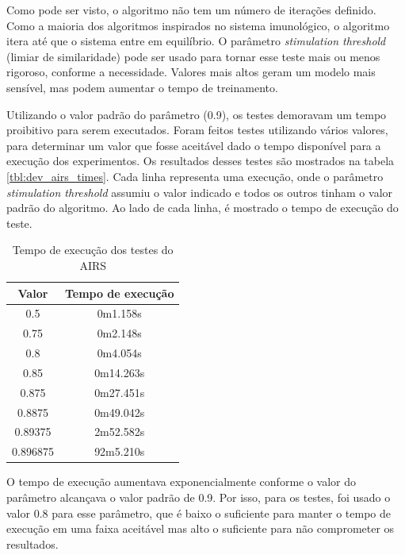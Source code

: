 Como pode ser visto, o algoritmo não tem um número de iterações definido. Como a maioria dos algoritmos inspirados no sistema imunológico, o algoritmo itera até que o sistema entre em equilíbrio. O parâmetro \emph{stimulation threshold} (limiar de similaridade) pode ser usado para tornar esse teste mais ou menos rigoroso, conforme a necessidade. Valores mais altos geram um modelo mais sensível, mas podem aumentar o tempo de treinamento.

Utilizando o valor padrão do parâmetro (0.9), os testes demoravam um tempo proibitivo para serem executados. Foram feitos testes utilizando vários valores, para determinar um valor que fosse aceitável dado o tempo disponível para a execução dos experimentos. Os resultados desses testes são mostrados na tabela \ref{tbl:dev_airs_times}. Cada linha representa uma execução, onde o parâmetro \emph{stimulation threshold} assumiu o valor indicado e todos os outros tinham o valor padrão do algoritmo. Ao lado de cada linha, é mostrado o tempo de execução do teste.

\begin{table}[h]
    \vspace{0.5cm}
    \scriptsize
    \centering
    \caption{Tempo de execução dos testes do AIRS}
    \label{tbl:dev_exec_summary}
    \vspace{0.5cm}
    \begin{tabular}{c c}
        \textbf{Valor} & \textbf{Tempo de execução} \\
        \hline
        0.5            &  0m1.158s  \\
        0.75           &  0m2.148s  \\
        0.8            &  0m4.054s  \\
        0.85           &  0m14.263s \\
        0.875          &  0m27.451s \\
        0.8875         &  0m49.042s \\
        0.89375        &  2m52.582s \\
        0.896875       &  92m5.210s \\
    \end{tabular}
    \vspace{0.5cm}
\end{table}

O tempo de execução aumentava exponencialmente conforme o valor do parâmetro alcançava o valor padrão de 0.9. Por isso, para os testes, foi usado o valor 0.8 para esse parâmetro, que é baixo o suficiente para manter o tempo de execução em uma faixa aceitável mas alto o suficiente para não comprometer os resultados.

